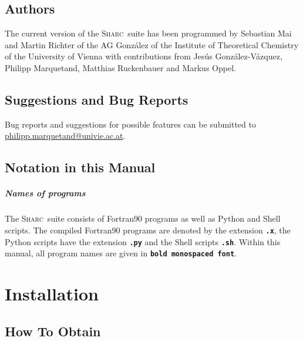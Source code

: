 \documentclass[a4paper,11pt,DIV=15,openany,twoside=false]{scrbook}
\newcommand{\sharc}{\textsc{Sharc}}
\newcommand{\todo}[1]{\textcolor{RL}{#1}}
\newcommand{\ttt}[1]{\textbf{\texttt{#1}}}
\newenvironment{example}{
  \vspace{0mm}
  \definecolor{shadecolor}{HTML}{BBDDFF}
  \begin{shaded}
  \begin{minipage}{0.9\textwidth}
}{
  \end{minipage}
  \end{shaded}
}
\begin{document}
\section{Authors}

The current version of the \sharc\ suite has been programmed by Sebastian Mai and Martin Richter of the AG Gonz\'alez of the Institute of Theoretical Chemistry of the University of Vienna with contributions from Jes\'us Gonz\'alez-V\'azquez, Philipp Marquetand, Matthias Ruckenbauer and Markus Oppel.

\section{Suggestions and Bug Reports}

\begin{example}
Bug reports and suggestions for possible features can be submitted to \href{mailto:philipp.marquetand@univie.ac.at}{philipp.marquetand@univie.ac.at}.
\end{example}

\section{Notation in this Manual}

\paragraph{Names of programs}

The \sharc\ suite consists of Fortran90 programs as well as Python and Shell scripts. The compiled Fortran90 programs are denoted by the extension \ttt{.x}, the Python scripts have the extension \ttt{.py} and the Shell scripts \ttt{.sh}. Within this manual, all program names are given in \ttt{bold monospaced font}.

\todo{}


\chapter{Installation}

\section{How To Obtain}
\end{document}
